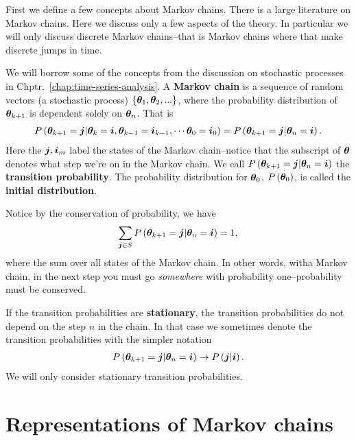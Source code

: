 
First we define a few concepts about Markov chains.
There is a large literature on Markov chains. 
Here we discuss only a few aspects of the theory. 
In particular we will only discuss discrete Markov chains--that is Markov chains where that make discrete jumps in time.

We will borrow some of the concepts from the discussion on stochastic processes in Chptr.~\ref{chap:time-series-analysis}.
A \textbf{Markov chain} is a sequence of random vectors (a stochastic process) $\left\{{\bm \theta}_1,{\bm \theta}_2,...\right\}$, where the probability distribution of ${\bm \theta}_{k+1}$ is dependent solely on ${\bm \theta}_n$.
That is 
\begin{align}
    P\left({\bm \theta}_{k+1}={\bm j}|{\bm \theta}_{k}={\bm i}, {\bm \theta}_{k-1} = {\bm i}_{k-1}, \cdots {\bm \theta}_{0} = {\bm i}_0\right) 
     =
     P\left({\bm \theta}_{k+1}={\bm j}|{\bm \theta}_n={\bm i}\right)
     .
\end{align}
Here the ${\bm j},{\bm i}_m$ label the states of the Markov chain--notice that the subscript of ${\bm \theta}$ denotes what step we're on in the Markov chain. 
We call $P\left({\bm \theta}_{k+1}={\bm j}|{\bm \theta}_n={\bm i}\right)$ the \textbf{transition probability}. 
The probability distribution for ${\bm \theta}_0$, $P\left({\bm \theta}_0\right)$, is called the \textbf{initial distribution}.

Notice by the conservation of probability, we have
\begin{align}
    \label{eq:conservation-of-probability}
    \sum_{{\bm j}\in S}P\left({\bm \theta}_{k+1}={\bm j}|{\bm \theta}_n={\bm i}\right)
    =
    1
    ,
\end{align}
where the sum over all states of the Markov chain.
In other words, witha Markov chain, in the next step you must go \emph{somewhere} with probability one--probability must be conserved.


If the transition probabilities are \textbf{stationary}, the transition probabilities do not depend on the step $n$ in the chain.
In that case we sometimes denote the transition probabilities with the simpler notation 
\begin{align}
     P\left({\bm \theta}_{k+1}={\bm j}|{\bm \theta}_n={\bm i}\right)
     \to
     P\left({\bm j}|{\bm i}\right)
    .
\end{align}
We will only consider stationary transition probabilities.
\section{Representations of Markov chains\label{sec:representations-markov-chains}}

